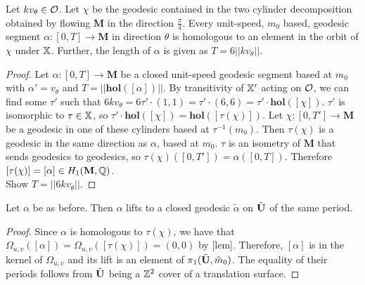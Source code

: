 \documentclass[]{article}
\def\hol{\mathbf{hol}}
\def\bM{\mathbf{M}}
\def\mtild{\tilde{m}_0}
\begin{document}
\begin{thm}
Let $kv_\theta\in\mathcal{O}$. Let $\chi$ be the geodesic contained in the two cylinder decomposition obtained by flowing $\bM$ in the direction $\frac{\pi}{4}$. Every unit-speed, $m_0$ based, geodesic segment $\alpha:[0,T]\rightarrow\bM$ in direction $\theta$ is homologous to an element in the orbit of $\chi$ under $\mathbb{X}$. Further, the length of $\alpha$ is given as $T=6||kv_\theta||$.
\begin{figure}[H]
\centering

\end{figure}
\begin{proof}
Let $\alpha:[0,T]\rightarrow\bM$ be a closed unit-speed geodesic segment based at $m_0$ with $\alpha'=v_\theta$ and $T=||\hol([\alpha])||$. By transitivity of $\mathbb{X}'$ acting on $\mathcal{O}$, we can find some $\tau'$ such that $6kv_\theta=6\tau'\cdot(1,1)=\tau'\cdot(6,6)=\tau'\cdot\hol([\chi])$. $\tau'$ is isomorphic to $\tau\in\mathbb{X}$, so $\tau'\cdot\hol([\chi])=\hol([\tau(\chi)])$. Let $\chi:[0,T']\rightarrow\bM$ be a geodesic in one of these cylinders based at $\tau^{-1}(m_0)$. Then $\tau(\chi)$ is a geodesic in the same direction as $\alpha$, based at $m_0$. $\tau$ is an isometry of $\bM$ that sends geodesics to geodesics, so $\tau(\chi)([0,T'])=\alpha([0,T])$. Therefore $[\tau(\chi)]=[\alpha]\in H_1(\bM,\QQ)$.\\
Show $T=||6kv_\theta||$.
\end{proof}
\end{thm}

\begin{cor}
Let $\alpha$ be as before. Then $\alpha$ lifts to a closed geodesic $\tilde{\alpha}$ on $\tilde{\mathbf{U}}$ of the same period.
\begin{proof}
Since $\alpha$ is homologous to $\tau(\chi)$, we have that $\Omega_{u,v}([\alpha])=\Omega_{u,v}([\tau(\chi)])=(0,0)$ by [lem]. Therefore, $[\alpha]$ is in the kernel of $\Omega_{u,v}$ and its lift is an element of $\pi_1(\btU,\mtild)$. The equality of their periods follows from $\tilde{\mathbf{U}}$ being a $\mathbb{Z}^2$ cover of a translation surface.
\end{proof}
\end{cor}
\end{document}
